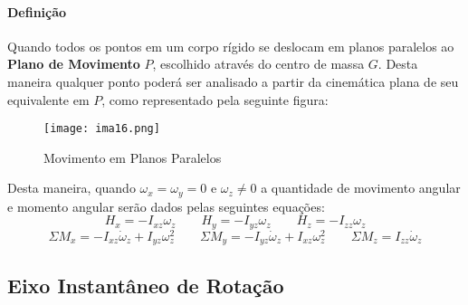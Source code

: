 \documentclass{article}
\begin{document}
            \paragraph{Definição}Quando todos os pontos em um corpo rígido se deslocam em planos paralelos ao \textbf{Plano de Movimento} $P$, escolhido através do centro de massa $G$. Desta maneira qualquer ponto poderá ser analisado a partir da cinemática plana de seu equivalente em $P$, como representado pela seguinte figura:
                \begin{figure}[H]
                    \centering
                    \texttt{[image: ima16.png]}
                    \caption{Movimento em Planos Paralelos}
                \end{figure}\noindent
            Desta maneira, quando $\omega_{x} = \omega_{y} = 0$ e $\omega_{z} \ne 0$ a quantidade de movimento angular e momento angular serão dados pelas seguintes equações:
                \begin{equation}
                    \boxed{
                        H_{x} = -I_{xz}\omega_{z}
                    }
                    \qquad
                    \boxed{
                        H_{y} = -I_{yz}\omega_{z}
                    }
                    \qquad
                    \boxed{
                        H_{z} = -I_{zz}\omega_{z}
                    }
                \end{equation}
                \begin{equation}
                    \boxed{
                        \Sigma M_{x} = -I_{xz}\dot{\omega}_{z} + I_{yz}\omega_{z}^{2}
                    }
                    \qquad
                    \boxed{
                        \Sigma M_{y} = -I_{yz}\dot{\omega}_{z} + I_{xz}\omega_{z}^{2}
                    }
                    \qquad
                    \boxed{
                        \Sigma M_{z} = I_{zz}\dot{\omega}_{z}
                    }
                \end{equation}
\newpage
        \subsection{Eixo Instantâneo de Rotação}
\end{document}

